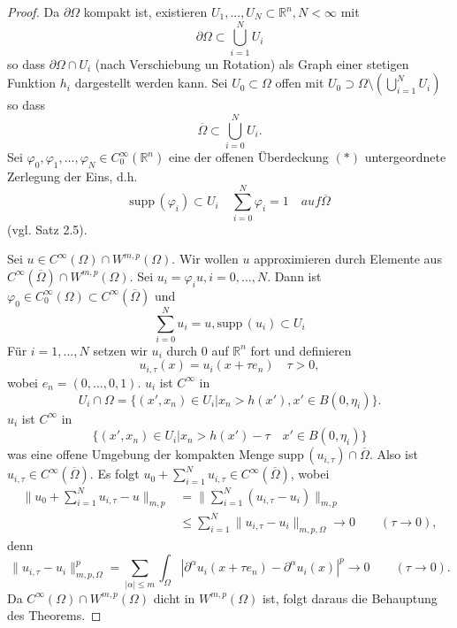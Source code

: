 \documentclass[
paper=a4,
bibtotocnumbered,
liststotocnumbered,
tablecaptionabove,
pointlessnumbers,
twoside,
openright,
10pt
]
{report}
\newcommand{\supp}{\mathrm{supp}\,}
\let\phi\varphi
\theoremstyle{definition}
\numberwithin{equation}{chapter}
\begin{document}
\begin{proof}
Da $\partial \Omega$ kompakt ist, existieren $U_1,..., U_N \subset \mathbb R^n, N<\infty$ mit
\begin{equation}
 \partial \Omega \subset \bigcup_{i=1}^N U_i
\end{equation}
so dass $\partial\Omega \cap U_i$ (nach Verschiebung un Rotation) als Graph einer stetigen Funktion $h_i$ dargestellt werden kann. Sei $U_0\subset \Omega$ offen mit $U_0\supset \Omega \setminus (\bigcup_{i=1}^N U_i)$ so dass
\begin{equation}\label{3.9kompakt}
 \overline{\Omega} \subset \bigcup_{i=0}^N U_i.
\end{equation}
Sei $\phi_0, \phi_1,\ldots, \phi_N \in C_0^\infty(\mathbb R^n)$ eine der offenen Überdeckung $(*)$ untergeordnete Zerlegung der Eins, d.h.
\begin{equation}
 \supp(\phi_i) \subset U_i \quad \sum_{i=0}^N \phi_i =1 \quad{auf } \overline{\Omega}
\end{equation}
(vgl. Satz 2.5).

Sei $u\in C^\infty(\Omega) \cap W^{m,p}(\Omega)$. Wir wollen $u$ approximieren durch Elemente aus $C^\infty(\overline{\Omega})\cap W^{m,p}(\Omega)$.  Sei $u_i = \phi_i u, i=0,\ldots, N$.  Dann ist $\phi_0 \in C_0^\infty(\Omega) \subset C^\infty(\overline{\Omega})$ und 
\begin{equation}
 \sum_{i=0}^N u_i = u, \supp(u_i) \subset U_i
\end{equation}
Für $i=1,\ldots, N$ setzen wir $u_i$ durch $0$ auf $\mathbb R^n$ fort und definieren
\begin{equation}
 u_{i,\tau}(x) =u_i(x+ \tau e_n) \quad \tau >0,
\end{equation}
wobei $e_n=(0,\ldots,0,1)$.
$u_i$ ist $C^\infty$ in 
\begin{equation}
U_i \cap \Omega = \{(x', x_n) \in U_i | x_n > h(x'), x' \in B(0,\eta_i)\}.
\end{equation} 
$u_i$ ist $C^\infty$ in 
\begin{equation}
 \{(x', x_n) \in U_i | x_n > h(x') - \tau \quad x'\in B(0,\eta_i)\}
\end{equation}
was eine offene Umgebung der kompakten Menge $\supp(u_{i,\tau}) \cap \overline{\Omega}$. Also ist $u_{i,\tau}\in C^\infty(\overline{\Omega})$. Es folgt $u_0 + \sum_{i=1}^N u_{i,\tau} \in C^\infty(\overline{\Omega})$, wobei
\begin{align*}
 \| u_0 + \sum_{i=1}^N u_{i,\tau} -u\|_{m,p} &= \| \sum_{i=1}^N (u_{i,\tau} - u_i)\|_{m,p}\\
 &\le \sum_{i=1}^N \| u_{i,\tau} - u_i \|_{m,p, \Omega} \to 0 \qquad (\tau \to 0),
\end{align*}
denn
\begin{equation}
 \| u_{i,\tau} - u_i \|^p_{m,p, \Omega} = \sum_{|\alpha|\le m} \int_\Omega | \partial^\alpha u_i (x+ \tau e_n) - \partial^\alpha u_i (x)|^p \to 0 \qquad (\tau \to 0). 
\end{equation}
Da $C^\infty(\Omega) \cap W^{m,p}(\Omega)$ dicht  in $W^{m,p}(\Omega)$ ist, folgt daraus die Behauptung des Theorems.
\end{proof}
\end{document}
